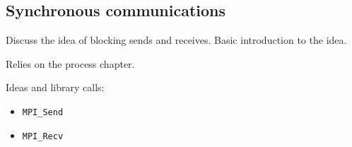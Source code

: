 \subsection{Synchronous communications}

\todo Discuss the idea of blocking sends and receives. Basic introduction to
the idea.

\todo Relies on the process chapter.

Ideas and library calls: \\
\begin{itemize}
\item \texttt{MPI\_Send}
\item \texttt{MPI\_Recv}
\end{itemize}

\lstset{language=C++, numbers=left, numberstyle=\tiny, stepnumber=1,
  numbersep=5pt, commentstyle=\scriptsize}
